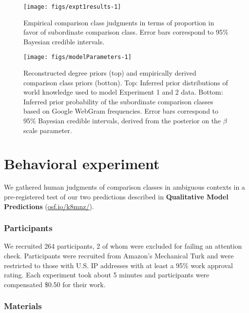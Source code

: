 \documentclass[doc]{apa6}
\begin{document}
\begin{figure*}[htb]

{\centering \texttt{[image: figs/expt1results-1]} 

}

\caption{Empirical comparison class judgments in terms of proportion in favor of subordinate comparison class.  Error bars correspond to 95\% Bayesian credible intervals.}\label{fig:expt1results}
\end{figure*}

\begin{figure*}[htb]

{\centering \texttt{[image: figs/modelParameters-1]} 

}

\caption{Reconstructed degree priors (top) and empirically derived comparison class priors (botton). Top: Inferred prior distributions of world knowledge used to model Experiment 1 and 2 data. Bottom: Inferred prior probability of the subordinate comparison classes based on Google WebGram frequencies. Error bars correspond to 95\% Bayesian credible intervals, derived from the posterior on the $\beta$ scale parameter.}\label{fig:modelParameters}
\end{figure*}

\section{Behavioral experiment}

We gathered human judgments of comparison classes in ambiguous contexts
in a pre-registered test of our two predictions described in
\textbf{Qualitative Model Predictions} (\url{osf.io/k8mnz/}).



\subsubsection{Participants}

We recruited 264 participants, 2 of whom were excluded for failing an
attention check. Participants were recruited from Amazon's Mechanical
Turk and were restricted to those with U.S. IP addresses with at least a
95\% work approval rating. Each experiment took about 5 minutes and
participants were compensated \$0.50 for their work.



\subsubsection{Materials}
\end{document}
